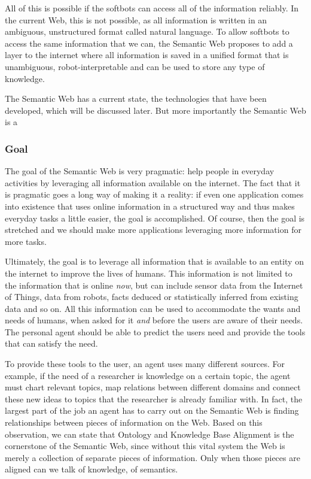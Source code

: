 \documentclass{article}
\begin{document}
 All of this is possible if the softbots can access all of the information reliably. In the current Web, this is not possible, as all information is written in an ambiguous, unstructured format called natural language. To allow softbots to access the same information that we can, the Semantic Web proposes to add a layer to the internet where all information is saved in a unified format that is unambiguous, robot-interpretable and can be used to store any type of knowledge.
 
 The Semantic Web has a current state, the technologies that have been developed, which will be discussed later. But more importantly the Semantic Web is a 
 
 \subsubsection{Goal}
 The goal of the Semantic Web is very pragmatic: help people in everyday activities by leveraging all information available on the internet. The fact that it is pragmatic goes a long way of making it a reality: if even one application comes into existence that uses online information in a structured way and thus makes everyday tasks a little easier, the goal is accomplished. Of course, then the goal is stretched and we should make more applications leveraging more information for more tasks.
 
 Ultimately, the goal is to leverage all information that is available to an entity on the internet to improve the lives of humans. This information is not limited to the information that is online \emph{now}, but can include sensor data from the Internet of Things, data from robots, facts deduced or statistically inferred from existing data and so on. All this information can be used to accommodate the wants and needs of humans, when asked for it \textit{and} before the users are aware of their needs. The personal agent should be able to predict the users need and provide the tools that can satisfy the need.
 
 To provide these tools to the user, an agent uses many different sources. For example, if the need of a researcher is knowledge on a certain topic, the agent must chart relevant topics, map relations between different domains and connect these new ideas to topics that the researcher is already familiar with. In fact, the largest part of the job an agent has to carry out on the Semantic Web is finding relationships between pieces of information on the Web. Based on this observation, we can state that Ontology and Knowledge Base Alignment is the cornerstone  of the Semantic Web, since without this vital system the Web is merely a collection of separate pieces of information. Only when those pieces are aligned can we talk of knowledge, of semantics.
 
\end{document}
